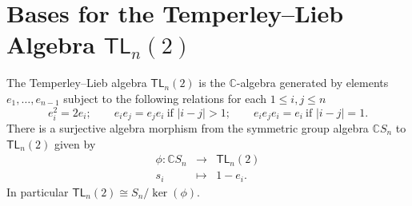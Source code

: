 \documentclass[submission]{FPSAC2024}
\theoremstyle{definition}
\theoremstyle{remark}
\numberwithin{equation}{section}
\newcommand{\CC}{\mathbb{C}}
\newcommand{\TL}{\mathsf{TL}}
\begin{document}
%
%
%
%


\section{Bases for the Temperley--Lieb Algebra $\TL_{n}(2)$}
\label{sec:TLbasis}

The Temperley--Lieb algebra $\TL_{n}(2)$ is the $\CC$-algebra generated by elements $e_{1}, \ldots, e_{n-1}$ subject to the following relations for each $1 \le i, j \le n$
\[
e_{i}^{2} = 2 e_{i}; \qquad
e_{i}e_{j} = e_{j}e_{i}  \ \text{if $|i - j| > 1$}; \qquad
e_{i} e_{j} e_{i} = e_{i} \  \text{if $|i - j| = 1$}.
\]
There is a surjective algebra morphism from the symmetric group algebra $\CC S_{n}$ to $\TL_{n}(2)$ given by 
\[
\begin{array}{rcl}
\phi: \CC S_{n} & \longrightarrow & \TL_{n}(2) \\
s_{i} & \longmapsto & 1 - e_{i}.
\end{array}
\]
In particular $\TL_{n}(2)\cong S_n\big/\!\ker(\phi)$.
\end{document}
